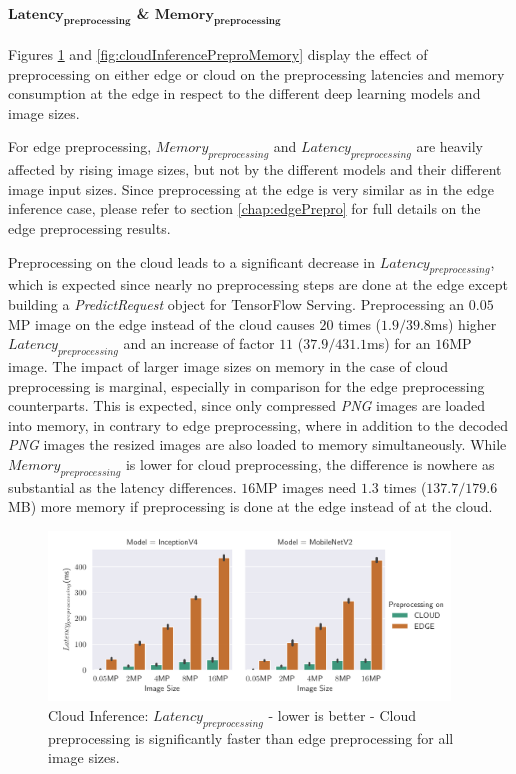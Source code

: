 \paragraph{$\mathbf{Latency_{preprocessing}}$ \& $\mathbf{Memory_{preprocessing}}$}
Figures \ref{fig:cloudInferencePreproLat} and \ref{fig:cloudInferencePreproMemory} display the effect of preprocessing on either edge or cloud on the preprocessing latencies and memory consumption at the edge in respect to the different deep learning models and image sizes.

For edge preprocessing, $Memory_{preprocessing}$ and $Latency_{preprocessing}$ are heavily affected by rising image sizes, but not by the different models and their different image input sizes.
Since preprocessing at the edge is very similar as in the edge inference case, please refer to section \ref{chap:edgePrepro} for full details on the edge preprocessing results.

Preprocessing on the cloud leads to a significant decrease in $Latency_{preprocessing}$, which is expected since nearly no preprocessing steps are done at the edge except building a \emph{PredictRequest} object for TensorFlow Serving.
Preprocessing an $0.05$MP image on the edge instead of the cloud causes $20$ times ($1.9/39.8$ms) higher $Latency_{preprocessing}$ and an increase of factor $11$ ($37.9/431.1$ms) for an $16$MP image.
The impact of larger image sizes on memory in the case of cloud preprocessing is marginal, especially in comparison for the edge preprocessing counterparts. This is expected, since only compressed \emph{PNG} images are loaded into memory, in contrary to edge preprocessing, where in addition to the decoded \emph{PNG} images the resized images are also loaded to memory simultaneously.
While $Memory_{preprocessing}$ is lower for cloud preprocessing, the difference is nowhere as substantial as the latency differences. $16$MP images need $1.3$ times ($137.7/179.6$MB) more memory if preprocessing is done at  the edge instead of at the cloud.

\begin{figure}[!htb]
\centering
\includegraphics[width=0.95\textwidth]{./Bilder/single_plots/cloud_inference_plots/Cloud_Inference_Preprocessing_Latency.pdf}
\caption[Cloud Inference:  $Latency_{preprocessing}$ - lower is better]{Cloud Inference:  $Latency_{preprocessing}$ - lower is better - Cloud preprocessing is significantly faster than edge preprocessing for all image sizes.}
\label{fig:cloudInferencePreproLat}
\end{figure}

